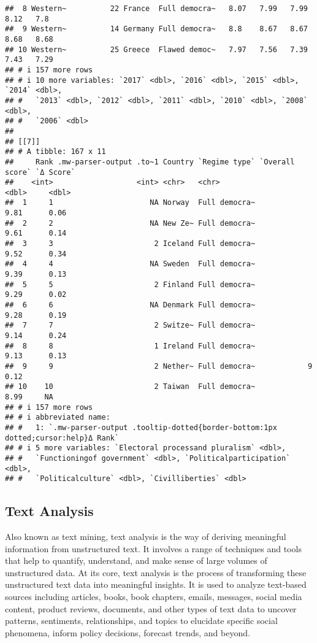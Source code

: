 \documentclass[
]{article}
\begin{document}
\begin{verbatim}
##  8 Western~          22 France  Full democra~   8.07   7.99   7.99   8.12   7.8 
##  9 Western~          14 Germany Full democra~   8.8    8.67   8.67   8.68   8.68
## 10 Western~          25 Greece  Flawed democ~   7.97   7.56   7.39   7.43   7.29
## # i 157 more rows
## # i 10 more variables: `2017` <dbl>, `2016` <dbl>, `2015` <dbl>, `2014` <dbl>,
## #   `2013` <dbl>, `2012` <dbl>, `2011` <dbl>, `2010` <dbl>, `2008` <dbl>,
## #   `2006` <dbl>
## 
## [[7]]
## # A tibble: 167 x 11
##     Rank .mw-parser-output .to~1 Country `Regime type` `Overall score` `Δ Score`
##    <int>                   <int> <chr>   <chr>                   <dbl>     <dbl>
##  1     1                      NA Norway  Full democra~            9.81      0.06
##  2     2                      NA New Ze~ Full democra~            9.61      0.14
##  3     3                       2 Iceland Full democra~            9.52      0.34
##  4     4                      NA Sweden  Full democra~            9.39      0.13
##  5     5                       2 Finland Full democra~            9.29      0.02
##  6     6                      NA Denmark Full democra~            9.28      0.19
##  7     7                       2 Switze~ Full democra~            9.14      0.24
##  8     8                       1 Ireland Full democra~            9.13      0.13
##  9     9                       2 Nether~ Full democra~            9         0.12
## 10    10                       2 Taiwan  Full democra~            8.99     NA   
## # i 157 more rows
## # i abbreviated name:
## #   1: `.mw-parser-output .tooltip-dotted{border-bottom:1px dotted;cursor:help}Δ Rank`
## # i 5 more variables: `Elec­toral pro­cessand plura­lism` <dbl>,
## #   `Func­tioningof govern­ment` <dbl>, `Poli­ticalpartici­pation` <dbl>,
## #   `Poli­ticalcul­ture` <dbl>, `Civilliber­ties` <dbl>
\end{verbatim}

\hypertarget{text-analysis}{%
\subsection{Text Analysis}\label{text-analysis}}

Also known as text mining, text analysis is the way of deriving
meaningful information from unstructured text. It involves a range of
techniques and tools that help to quantify, understand, and make sense
of large volumes of unstructured data. At its core, text analysis is the
process of transforming these unstructured text data into meaningful
insights. It is used to analyze text-based sources including articles,
books, book chapters, emails, messages, social media content, product
reviews, documents, and other types of text data to uncover patterns,
sentiments, relationships, and topics to elucidate specific social
phenomena, inform policy decisions, forecast trends, and beyond.
\end{document}

